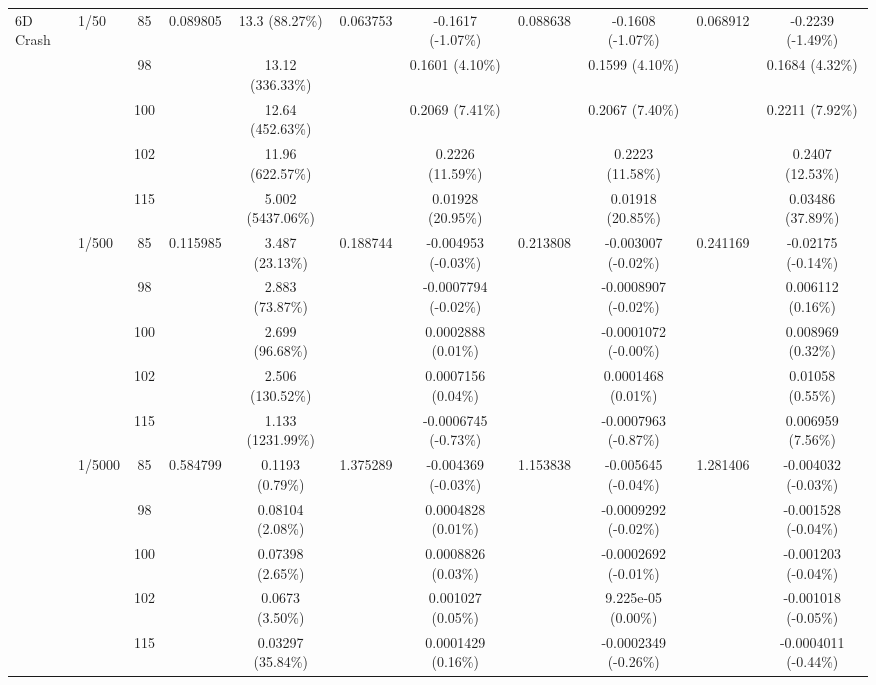 \begin{table}[htbp]
{\begin{tabular}{llccccccccc}
\multirow{15}{*}{6D Crash}
& \multirow{5}{*}{1/50} & 85 & \multirow{5}{*}{0.089805} & 13.3 (88.27\%) & \multirow{5}{*}{0.063753} & -0.1617 (-1.07\%) & \multirow{5}{*}{0.088638} & -0.1608 (-1.07\%) & \multirow{5}{*}{0.068912} & -0.2239 (-1.49\%) \\
& & 98 & & 13.12 (336.33\%) & & 0.1601 (4.10\%) & & 0.1599 (4.10\%) & & 0.1684 (4.32\%) \\
& & 100 & & 12.64 (452.63\%) & & 0.2069 (7.41\%) & & 0.2067 (7.40\%) & & 0.2211 (7.92\%) \\
& & 102 & & 11.96 (622.57\%) & & 0.2226 (11.59\%) & & 0.2223 (11.58\%) & & 0.2407 (12.53\%) \\
& & 115 & & 5.002 (5437.06\%) & & 0.01928 (20.95\%) & & 0.01918 (20.85\%) & & 0.03486 (37.89\%) \\
\cmidrule(lr){2-11}
& \multirow{5}{*}{1/500} & 85 & \multirow{5}{*}{0.115985} & 3.487 (23.13\%) & \multirow{5}{*}{0.188744} & -0.004953 (-0.03\%) & \multirow{5}{*}{0.213808} & -0.003007 (-0.02\%) & \multirow{5}{*}{0.241169} & -0.02175 (-0.14\%) \\
& & 98 & & 2.883 (73.87\%) & & -0.0007794 (-0.02\%) & & -0.0008907 (-0.02\%) & & 0.006112 (0.16\%) \\
& & 100 & & 2.699 (96.68\%) & & 0.0002888 (0.01\%) & & -0.0001072 (-0.00\%) & & 0.008969 (0.32\%) \\
& & 102 & & 2.506 (130.52\%) & & 0.0007156 (0.04\%) & & 0.0001468 (0.01\%) & & 0.01058 (0.55\%) \\
& & 115 & & 1.133 (1231.99\%) & & -0.0006745 (-0.73\%) & & -0.0007963 (-0.87\%) & & 0.006959 (7.56\%) \\
\cmidrule(lr){2-11}
& \multirow{5}{*}{1/5000} & 85 & \multirow{5}{*}{0.584799} & 0.1193 (0.79\%) & \multirow{5}{*}{1.375289} & -0.004369 (-0.03\%) & \multirow{5}{*}{1.153838} & -0.005645 (-0.04\%) & \multirow{5}{*}{1.281406} & -0.004032 (-0.03\%) \\
& & 98 & & 0.08104 (2.08\%) & & 0.0004828 (0.01\%) & & -0.0009292 (-0.02\%) & & -0.001528 (-0.04\%) \\
& & 100 & & 0.07398 (2.65\%) & & 0.0008826 (0.03\%) & & -0.0002692 (-0.01\%) & & -0.001203 (-0.04\%) \\
& & 102 & & 0.0673 (3.50\%) & & 0.001027 (0.05\%) & & 9.225e-05 (0.00\%) & & -0.001018 (-0.05\%) \\
& & 115 & & 0.03297 (35.84\%) & & 0.0001429 (0.16\%) & & -0.0002349 (-0.26\%) & & -0.0004011 (-0.44\%) \\
\midrule


\end{tabular}}
\end{table}
